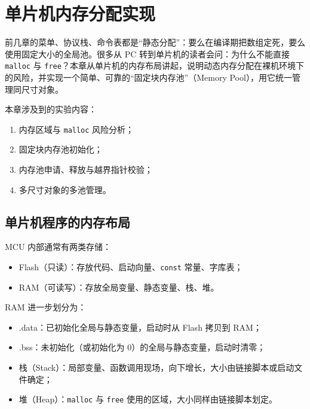\chapter{单片机内存分配实现} \label{ch:memory-alloc}

前几章的菜单、协议栈、命令表都是“静态分配”：要么在编译期把数组定死，要么使用固定大小的全局池。很多从 PC 转到单片机的读者会问：为什么不能直接 \texttt{malloc} 与 \texttt{free}？本章从单片机的内存布局讲起，说明动态内存分配在裸机环境下的风险，并实现一个简单、可靠的“固定块内存池”（Memory Pool），用它统一管理同尺寸对象。

\medskip 本章涉及到的实验内容：
\begin{enumerate}
\item 内存区域与 \texttt{malloc} 风险分析；
\item 固定块内存池初始化；
\item 内存池申请、释放与越界指针校验；
\item 多尺寸对象的多池管理。
\end{enumerate}

\section{单片机程序的内存布局}

MCU 内部通常有两类存储：

\begin{itemize}
\item Flash（只读）：存放代码、启动向量、\texttt{const} 常量、字库表；
\item RAM（可读写）：存放全局变量、静态变量、栈、堆。
\end{itemize}

RAM 进一步划分为：

\begin{itemize}
\item .data：已初始化全局与静态变量，启动时从 Flash 拷贝到 RAM；
\item .bss：未初始化（或初始化为 0）的全局与静态变量，启动时清零；
\item 栈（Stack）：局部变量、函数调用现场，向下增长，大小由链接脚本或启动文件确定；
\item 堆（Heap）：\texttt{malloc} 与 \texttt{free} 使用的区域，大小同样由链接脚本划定。
\end{itemize}

